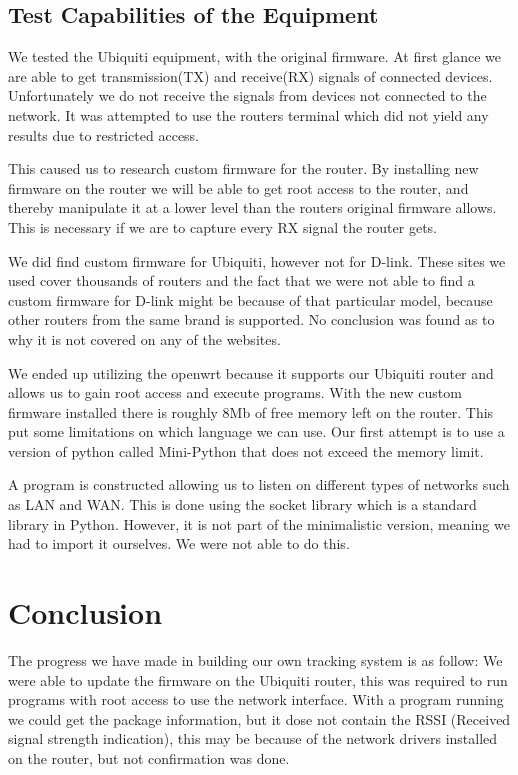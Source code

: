 \subsection*{Test Capabilities of the Equipment}
We tested the Ubiquiti equipment, with the original firmware. At first glance we are able to get transmission(TX) and receive(RX) signals of connected devices. Unfortunately we do not receive the signals from devices not connected to the network. It was attempted to use the routers terminal which did not yield any results due to restricted access.

This caused us to research custom firmware for the router. By installing new firmware on the router we will be able to get root access to the router, and thereby manipulate it at a lower level than the routers original firmware allows. This is necessary if we are to capture every RX signal the router gets.

We did find custom firmware for Ubiquiti, however not for D-link. These sites we used cover thousands of routers and the fact that we were not able to find a custom firmware for D-link might be because of that particular model, because other routers from the same brand is supported. No conclusion was found as to why it is not covered on any of the websites\cite{firmware_1}\cite{firmware_2}\cite{firmware_3}\cite{firmware_4}\cite{firmware_5}\cite{firmware_6}.

We ended up utilizing the openwrt because it supports our Ubiquiti router and allows us to gain root access and execute programs. With the new custom firmware installed there is roughly 8Mb of free memory left on the router. This put some limitations on which language we can use. Our first attempt is to use a version of python called Mini-Python that does not exceed the memory limit.

A program is constructed allowing us to listen on different types of networks such as LAN and WAN. This is done using the socket library which is a standard library in Python. However, it is not part of the minimalistic version, meaning we had to import it ourselves. We were not able to do this.

\section*{Conclusion}
The progress we have made in building our own tracking system is as follow: We were able to update the firmware on the Ubiquiti router, this was required to run programs with root access to use the network interface. With a program running we could get the package information, but it dose not contain the RSSI (Received signal strength indication), this may be because of the network drivers installed on the router, but not confirmation was done. 